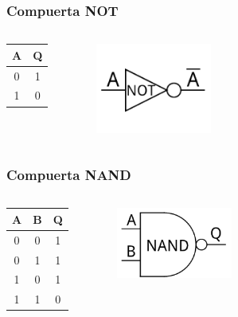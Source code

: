 \documentclass{beamer}
\begin{document}
\begin{frame}
\frametitle{Compuerta NOT}
\begin{columns}[c]
\begin{center}
\begin{tabular}{c|c}
A & Q \\ 
\hline 
0 & 1 \\   
1 & 0 \\ 
\end{tabular} 
\end{center}
\begin{figure}[!h]
\centering
\includegraphics[width=1.5in]{not}
\end{figure}
\end{columns}
\end{frame}

\begin{frame}
\frametitle{Compuerta NAND}
\begin{columns}[c]
\begin{center}
\begin{tabular}{cc|c}
A & B & Q \\ 
\hline 
0 & 0 & 1 \\  
0 & 1 & 1 \\  
1 & 0 & 1 \\ 
1 & 1 & 0 \\ 
\end{tabular} 
\end{center}
\begin{figure}[!h]
\centering
\includegraphics[width=1.5in]{nand}
\end{figure}
\end{columns}
\end{frame}
\end{document}
